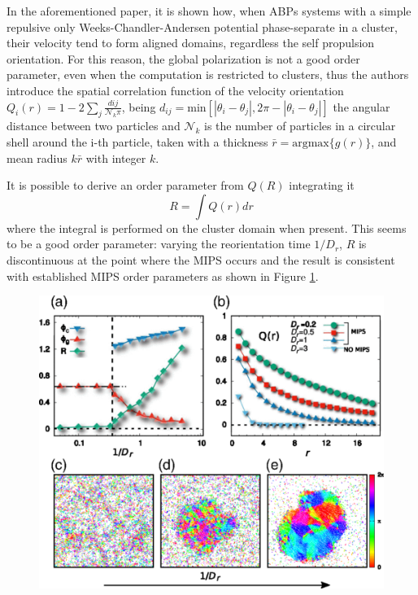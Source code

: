 \documentclass[../../master_thesis_np.tex]{subfiles}
\begin{document}
	In the aforementioned paper, it is shown how, when ABPs systems with a simple repulsive only Weeks-Chandler-Andersen potential phase-separate in a cluster, their velocity tend to form aligned domains, regardless the self propulsion orientation. For this reason, the global polarization is not a good order parameter, even when the computation is restricted to clusters, thus the authors introduce the spatial correlation function of the velocity orientation $Q_i(r) = 1-2\sum_{j} \frac{d{ij}}{\mathcal{N}_k \pi } $, being $d_{ij} = \mathrm{min}\left[|\theta_i - \theta_j|, 2 \pi - |\theta_i - \theta_j| \right]$ the angular distance between two particles and $\mathcal{N}_k$ is the number of particles in a circular shell around the i-th particle, taken with a thickness $\bar{r} = \mathrm{argmax} \{g(r)\}$, and mean radius $k\bar{r}$ with integer $k$. 
	
	It is possible to derive an order parameter from $Q(R)$ integrating it
	\[ 
	R = \int Q(r) dr \]
	where the integral is performed on the cluster domain when present. 
	This seems to be a good order parameter: varying the reorientation time $1/D_r$, $R$ is discontinuous at the point where the MIPS occurs and the result is consistent with established MIPS order parameters as shown in Figure \ref{fig:caprini1}.
	
	\begin{figure}[htp]
		\centering
		\includegraphics[width=\textwidth]{caprini2.png}
		\caption{\parencite{caprini_spontaneous_2020}}
		\label{fig:caprini1}
	\end{figure}
	
\end{document}
